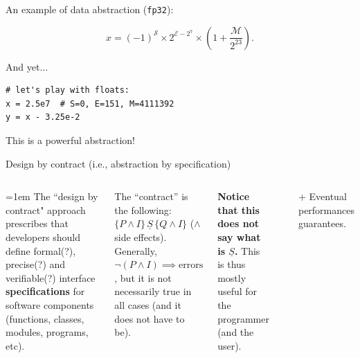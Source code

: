 \documentclass[10pt,
aspectratio=169
]{beamer}
\begin{document}
\begin{frame}[fragile]
	An example of data abstraction (\texttt{fp32}):
	\begin{center}
		\begin{equation*}
			x = (-1)^\mathcal{S} \times 2^{\mathcal{E}-2^7} \times \left(1+\frac{\mathcal M}{2^{23}}\right).
		\end{equation*}
	\end{center}
	And yet...
	\begin{verbatim}
# let's play with floats:
x = 2.5e7  # S=0, E=151, M=4111392
y = x - 3.25e-2
	\end{verbatim}
	This is a powerful abstraction!
\end{frame}

\begin{frame}{Design by contract (i.e., abstraction by specification)}
	\vspace*{1em}
	\begin{columns}
	\parskip=1em
	The ``design by contract" approach prescribes that developers should define formal(?), precise(?) and verifiable(?) interface \textbf{specifications} for software components (functions, classes, modules, programs, etc). 
	
	The ``contract'' is the following: $\{P\land I\} \,\underline{S}\,\{Q\land I\}$ ($\land$ side effects). Generally, $\lnot (P \land I)\implies \text{errors}$, but it is not necessarily true in all cases (and it does not have to be). 
	
	\textbf{Notice that this does not say what is $\underline{S}$.} This is thus mostly useful for the programmer (and the user).
	
	\begin{center}
	\end{center}
	\vspace*{1em}
	+ Eventual performances guarantees.
	\end{columns}
\end{frame}
\end{document}
